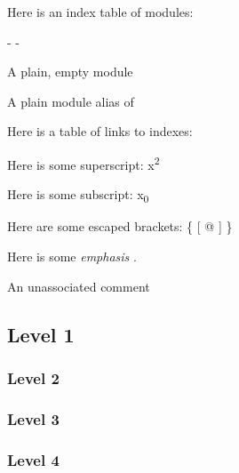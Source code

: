 Here is an index table of  modules:

\begin{description}\kern-\topsep
\makeatletter\advance\@topsepadd-\topsep\makeatother%
\item[{\hyperref[module-Ocamlary-module-Empty]{\ocamlinlinecode{\ocamlinlinecode{Empty}}[p\pageref*{module-Ocamlary-module-Empty}]}}]{A plain, empty module}%
\item[{\hyperref[module-Ocamlary-module-Empty]{\ocamlinlinecode{\ocamlinlinecode{EmptyAlias}}[p\pageref*{module-Ocamlary-module-Empty}]}}]{A plain module alias of }\end{description}%
Here is a table of links to indexes: 

Here is some superscript: x\textsuperscript{2}

Here is some subscript: x\textsubscript{0}

Here are some escaped brackets: \{ [ @ ] \}

Here is some \emph{emphasis} .

An unassociated comment

\subsection{Level 1\label{level-1}}%
\subsubsection{Level 2\label{level-2}}%
\subsubsection{Level 3\label{level-3}}%
\subsubsection{Level 4\label{level-4}}%
